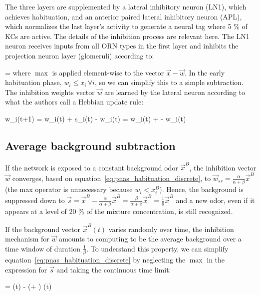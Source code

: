 The three layers are supplemented by a lateral inhibitory neuron (LN1), which achieves habituation, and an anterior paired lateral inhibitory neuron (APL), which normalizes the last layer's activity to generate a neural tag where 5 \% of KCs are active. The details of the inhibition process are relevant here. The LN1 neuron receives inputs from all ORN types in the first layer and inhibits the projection neuron layer (glomeruli) according to:

\beq
	 = 
	\label{eq:pnas_inhibition}
\eeq
where $\max$ is applied element-wise to the vector $\vec{x} - \vec{w}$. In the early habituation phase, $w_i \leq x_i \, \forall i$, so we can simplify this to a simple subtraction. The inhibition weights vector $\vec{w}$ are learned by the lateral neuron according to what the authors call a Hebbian update rule:

\beq
	w_i(t+1) = w_i(t) + \alpha s_i(t) - \beta w_i(t) = w_i(t) + \alpha {} - \beta w_i(t) 
	\label{eq:pnas_habituation_discrete}
\eeq


\subsection{Average background subtraction}
\label{subsect:average_subtraction}
If the network is exposed to a constant background odor $\vec{x}^B$, the inhibition vector $\vec{w}$ converges, based on equation~\eqref{eq:pnas_habituation_discrete}, to $\vec{w}_{ss} = \frac{\alpha}{\alpha + \beta} \vec{x}^B$ (the max operator is unnecessary because $w_i < x_i^B$). Hence, the background is suppressed down to $\vec{s} = \vec{x}^B - \frac{\alpha}{\alpha + \beta} \vec{x}^B = \frac{\beta}{\alpha + \beta} \vec{x}^B = \frac16 \vec{x}^B$ and a new odor, even if it appears at a level of 20 \% of the mixture concentration, is still recognized. 

If the background vector $\vec{x}^B(t)$ varies randomly over time, the inhibition mechanism for $\vec{w}$ amounts to computing to be the average background over a time window of duration $\frac{1}{\beta}$. To understand this property, we can simplify equation~\eqref{eq:pnas_habituation_discrete} by neglecting the $\max$ in the expression for $\vec{s}$ and taking the continuous time limit:

\beq
	 = \alpha {}(t) - (\alpha + \beta) (t)
	\label{eq:pnas_habituation_continuous}
\eeq

